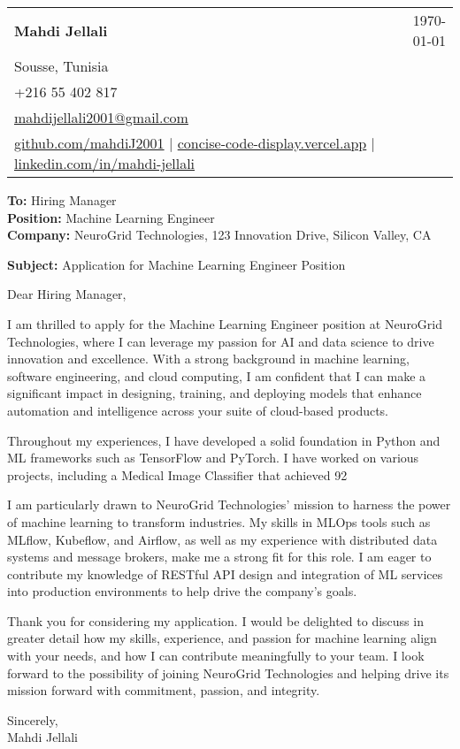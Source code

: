 \documentclass[letterpaper,11pt]{article}
\makeatletter
\newcommand{\letterHeading}[5]{
    \begin{tabular*}{\textwidth}{l@{\extracolsep{\fill}}r}
    \textbf{\Large #1} & #5 \\  %
    #2 & \\
    #3 & \\
    #4 & \\
    \end{tabular*}
    \vspace{15pt}
}
\newcommand{\letterRecipient}[3]{
    \textbf{\large To:} #1 \\
    \textbf{\large Position:} #2 \\
    \textbf{\large Company:} #3 \\
    \vspace{12pt}
}
\newcommand{\letterSubject}[1]{
    \textbf{\large Subject:} #1 \\
    \vspace{15pt}
}
\makeatother
\begin{document}
    \letterHeading
    {Mahdi Jellali}
    {Sousse, Tunisia}
    {+216 55 402 817 \\ \href{mailto:mahdijellali2001@gmail.com}{mahdijellali2001@gmail.com}}
    {\href{https://github.com/mahdiJ2001}{github.com/mahdiJ2001} $|$ \href{https://concise-code-display.vercel.app/}{concise-code-display.vercel.app} $|$ \href{https://www.linkedin.com/in/mahdi-jellali/}{linkedin.com/in/mahdi-jellali}}
    {\today}

    \letterRecipient
    {Hiring Manager}
    {Machine Learning Engineer}
    {NeuroGrid Technologies, 123 Innovation Drive, Silicon Valley, CA}

    \letterSubject{Application for Machine Learning Engineer Position}

    Dear Hiring Manager,

    I am thrilled to apply for the Machine Learning Engineer position at NeuroGrid Technologies, where I can leverage my passion for AI and data science to drive innovation and excellence. With a strong background in machine learning, software engineering, and cloud computing, I am confident that I can make a significant impact in designing, training, and deploying models that enhance automation and intelligence across your suite of cloud-based products.

    Throughout my experiences, I have developed a solid foundation in Python and ML frameworks such as TensorFlow and PyTorch. I have worked on various projects, including a Medical Image Classifier that achieved 92%

    I am particularly drawn to NeuroGrid Technologies' mission to harness the power of machine learning to transform industries. My skills in MLOps tools such as MLflow, Kubeflow, and Airflow, as well as my experience with distributed data systems and message brokers, make me a strong fit for this role. I am eager to contribute my knowledge of RESTful API design and integration of ML services into production environments to help drive the company's goals.

    Thank you for considering my application. I would be delighted to discuss in greater detail how my skills, experience, and passion for machine learning align with your needs, and how I can contribute meaningfully to your team. I look forward to the possibility of joining NeuroGrid Technologies and helping drive its mission forward with commitment, passion, and integrity.

    Sincerely,\\[12pt]

    Mahdi Jellali
\end{document}
